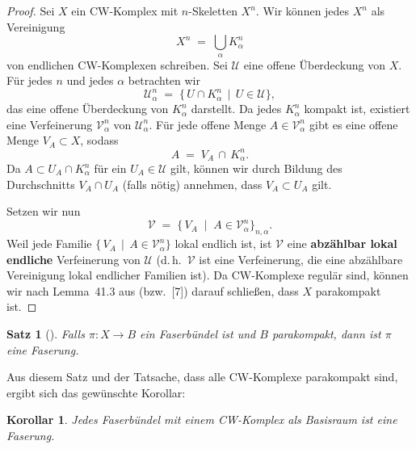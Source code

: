 \documentclass[12pt]{article}
\numberwithin{conj}{section}
\newtheorem{theorem}[conj]{Satz}
\newtheorem{corollary}[conj]{Korollar}
\begin{document}
                \begin{proof}
                    Sei $X$ ein CW-Komplex mit $n$-Skeletten $X^n$. Wir können jedes $X^n$ als Vereinigung 
                    \[
                        X^n \;=\; \bigcup_{\alpha} K^n_{\alpha}
                    \]
                    von endlichen CW-Komplexen schreiben. Sei $\mathcal{U}$ eine offene Überdeckung von $X$. Für jedes $n$ und jedes $\alpha$ betrachten wir
                    \[
                        \mathcal{U}^n_\alpha \;=\; \{\,U \cap K^n_{\alpha} \,\mid\, U \in \mathcal{U}\},
                    \]
                    das eine offene Überdeckung von $K^n_{\alpha}$ darstellt. Da jedes $K^n_{\alpha}$ kompakt ist, existiert eine Verfeinerung $\mathcal{V}^n_\alpha$ von $\mathcal{U}^n_\alpha$. Für jede offene Menge $A \in \mathcal{V}^n_\alpha$ gibt es eine offene Menge $V_A \subset X$, sodass
                    \[
                        A \;=\; V_A \,\cap\, K^n_{\alpha}.
                    \]
                    Da $A \subset U_A \cap K^n_{\alpha}$ für ein $U_A \in \mathcal{U}$ gilt, können wir durch Bildung des Durchschnitts $V_A \cap U_A$ (falls nötig) annehmen, dass $V_A \subset U_A$ gilt.
                    
                    Setzen wir nun
                    \[
                        \mathcal{V} \;=\; \bigl\{\,V_A \;\mid\; A \in \mathcal{V}^n_{\alpha}\bigr\}_{n,\alpha}.
                    \]
                    Weil jede Familie $\{\,V_A \,\mid\, A \in \mathcal{V}^n_{\alpha}\}$ lokal endlich ist, ist $\mathcal{V}$ eine \textbf{abzählbar lokal endliche} Verfeinerung von $\mathcal{U}$ (d.\,h.\ $\mathcal{V}$ ist eine Verfeinerung, die eine abzählbare Vereinigung lokal endlicher Familien ist). Da CW-Komplexe regulär sind, können wir nach Lemma~41.3 aus \cite{hatcher2001} (bzw.\ [7]) darauf schließen, dass $X$ parakompakt ist.
                \end{proof}
                
                \begin{theorem}[{\cite[Theorem 1]{huebsch1955}}]
                    Falls \(\pi : X \to B\) ein Faserbündel ist und \(B\) parakompakt, dann ist \(\pi\) eine Faserung.
                \end{theorem}
                
                \noindent
                Aus diesem Satz und der Tatsache, dass alle CW-Komplexe parakompakt sind, ergibt sich das gewünschte Korollar:
                
                \begin{corollary}
                    Jedes Faserbündel mit einem CW-Komplex als Basisraum ist eine Faserung.
                \end{corollary}
                
\end{document}
